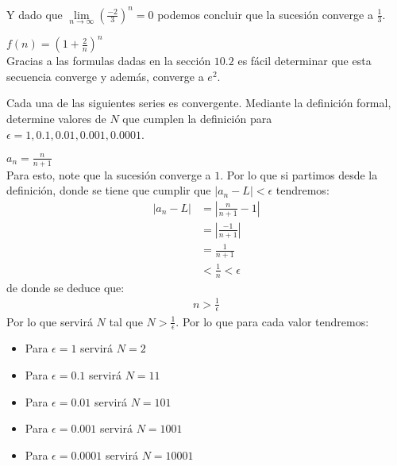 \documentclass[../main.tex]{subfiles}
\begin{document}
Y dado que $\lim\limits_{n \to \infty} \left(\frac{-2}{3}\right)^n = 0$ podemos concluir que la sucesión converge a $\frac{1}{3}$.

\question $f(n) = \left(1 + \frac{2}{n}\right)^n$\\
Gracias a las formulas dadas en la sección $10.2$ es fácil determinar que esta secuencia converge y además, converge a $e^2$.

Cada una de las siguientes series es convergente. Mediante la definición formal, determine valores de $N$ que cumplen la definición para $\epsilon = 1, 0.1, 0.01, 0.001, 0.0001$.

\question $a_n = \frac{n}{n+1}$\\
Para esto, note que la sucesión converge a $1$. Por lo que si partimos desde la definición, donde se tiene que cumplir que $|a_n - L| < \epsilon$ tendremos:
\begin{align*}
    |a_n - L| &= \left|\frac{n}{n+1} - 1 \right|\\
    &= \left|\frac{-1}{n+1}\right|\\
    &= \frac{1}{n+1}\\
    &< \frac{1}{n} < \epsilon
\end{align*}
de donde se deduce que:
\begin{align*}
    n > \frac{1}{\epsilon}
\end{align*}
Por lo que servirá $N$ tal que $N > \frac{1}{\epsilon}$. Por lo que para cada valor tendremos:
\begin{itemize}
    \item Para $\epsilon = 1$ servirá $N = 2$
    \item Para $\epsilon = 0.1$ servirá $N = 11$
    \item Para $\epsilon = 0.01$ servirá $N = 101$
    \item Para $\epsilon = 0.001$ servirá $N = 1001$
    \item Para $\epsilon = 0.0001$ servirá $N = 10001$
\end{itemize}
\end{document}
